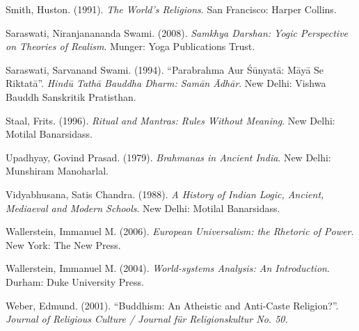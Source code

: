 \begin{thebibliography}{99}
  Smith, Huston. (1991). \textit{The World’s Religions}. San Francisco: Harper Collins.

  Saraswati, Niranjanananda Swami. (2008). \textit{Samkhya Darshan: Yogic Perspective on Theories of Realism}. Munger: Yoga Publications Trust.

  Saraswati, Sarvanand Swami. (1994). “Parabrahma Aur Śūnyatā: Māyā Se Riktatā”. \textit{Hindū Tathā Bauddha Dharm: Samān Ādhār}. New Delhi: Vishwa Bauddh Sanskritik Pratisthan.

  Staal, Frits. (1996). \textit{Ritual and Mantras: Rules Without Meaning}. New Delhi: Motilal Banarsidass.

  Upadhyay, Govind Prasad. (1979). \textit{Brahmanas in Ancient India}. New Delhi: Munshiram Manoharlal.

  Vidyabhusana, Satis Chandra. (1988). \textit{A History of Indian Logic, Ancient, Mediaeval and Modern Schools}. New Delhi: Motilal Banarsidass.

  Wallerstein, Immanuel M. (2006). \textit{European Universalism: the Rhetoric of Power}. New York: The New Press.

  Wallerstein, Immanuel M. (2004). \textit{World-systems Analysis: An Introduction}. Durham: Duke University Press.

  Weber, Edmund. (2001). “Buddhism: An Atheistic and Anti-Caste Religion?”. \textit{Journal of Religious Culture / Journal für Religionskultur No. 50.}

 \end{thebibliography}

\theendnotes


